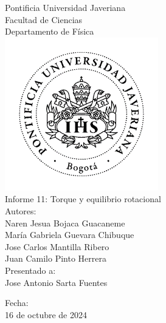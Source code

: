 \begin{titlepage}
    \centering

    {\large Pontificia Universidad Javeriana}\\[0.2cm]
    {\large Facultad de Ciencias}\\[0.2cm]
    {\large Departamento de Física}\\[1.2cm]
    

    \includegraphics[width=0.5\textwidth]{Imágenes, tablas y gráficas/PUJ.png} \\[1cm]%

     {\huge Informe 11: Torque y equilibrio rotacional} \\[1cm]

    {\large Autores:\\Naren Jesua Bojaca Guacaneme\\María Gabriela Guevara Chibuque\\Jose Carlos Mantilla Ribero\\Juan Camilo Pinto Herrera} \\[0.5cm]

    {\large Presentado a:\\Jose Antonio Sarta Fuentes} \\[0.5cm]

    \vfill %

    {\large Fecha:\\16 de octubre de 2024} %
\end{titlepage}
